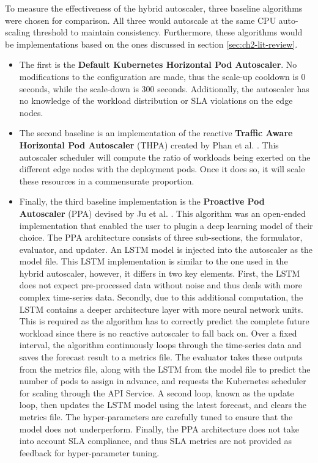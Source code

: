 To measure the effectiveness of the hybrid autoscaler, three baseline algorithms were chosen for comparison. All three would autoscale at the same CPU auto-scaling threshold to maintain consistency. Furthermore, these algorithms would be implementations based on the ones discussed in section \ref{sec:ch2-lit-review}.\par

\begin{itemize}
    \item The first is the \textbf{Default Kubernetes Horizontal Pod Autoscaler}. No modifications to the configuration are made, thus the scale-up cooldown is 0 seconds, while the scale-down is 300 seconds. Additionally, the autoscaler has no knowledge of the workload distribution or SLA violations on the edge nodes.
    \item The second baseline is an implementation of the reactive \textbf{Traffic Aware Horizontal Pod Autoscaler} (THPA) created by Phan et al. \cite{phan2022traffic}. This autoscaler scheduler will compute the ratio of workloads being exerted on the different edge nodes with the deployment pods. Once it does so, it will scale these resources in a commensurate proportion.
    \item Finally, the third baseline implementation is the \textbf{Proactive Pod Autoscaler} (PPA) devised by Ju et al. \cite{ju2021proactive}. This algorithm was an open-ended implementation that enabled the user to plugin a deep learning model of their choice. The PPA architecture consists of three sub-sections, the formulator, evaluator, and updater. An LSTM model is injected into the autoscaler as the model file. This LSTM implementation is similar to the one used in the hybrid autoscaler, however, it differs in two key elements. First, the LSTM does not expect pre-processed data without noise and thus deals with more complex time-series data. Secondly, due to this additional computation, the LSTM contains a deeper architecture layer with more neural network units. This is required as the algorithm has to correctly predict the complete future workload since there is no reactive autoscaler to fall back on. Over a fixed interval, the algorithm continuously loops through the time-series data and saves the forecast result to a metrics file. The evaluator takes these outputs from the metrics file, along with the LSTM from the model file to predict the number of pods to assign in advance, and requests the Kubernetes scheduler for scaling through the API Service. A second loop, known as the update loop, then updates the LSTM model using the latest forecast, and clears the metrics file. The hyper-parameters are carefully tuned to ensure that the model does not underperform. Finally, the PPA architecture does not take into account SLA compliance, and thus SLA metrics are not provided as feedback for hyper-parameter tuning.
\end{itemize}

